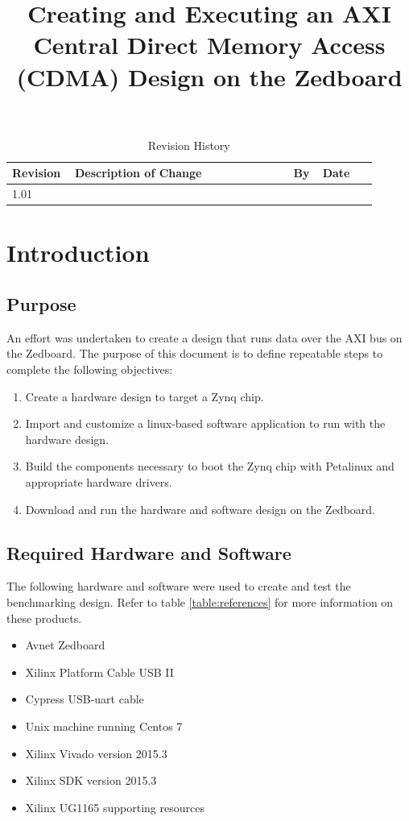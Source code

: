 \documentclass[12pt]{article}
\title{Creating and Executing an AXI Central Direct Memory Access (CDMA) Design on the Zedboard}
\begin{document}
\date{} %
\maketitle
\newpage
\begin{table}[h!]
  \caption{Revision History}
  \begin{tabular}{|p{0.12\linewidth}|p{0.57\linewidth}|p{0.07\linewidth}|p{0.14\linewidth}|}
    \hline
    \textbf{Revision} & \textbf{Description of Change} & \textbf{By} & \textbf{Date}\\ \hline
    1.01 &   &   &  \\ \hline
  \end{tabular}
\end{table}
\newpage
\tableofcontents
\newpage
{}

\section{Introduction}

\subsection{Purpose}
An effort was undertaken to create a design that runs data over the AXI bus on the Zedboard.  The purpose of this document is to define repeatable steps to complete the following objectives:

\begin{enumerate}

\item Create a hardware design to target a Zynq chip.
\item Import and customize a linux-based software application to run with the hardware design.
\item Build the components necessary to boot the Zynq chip with Petalinux and appropriate hardware drivers.
\item Download and run the hardware and software design on the Zedboard.
\end{enumerate}

\subsection{Required Hardware and Software}
The following hardware and software were used to create and test the benchmarking design.  Refer to table \ref{table:references} for more information on these products.
\begin{itemize}
\item Avnet Zedboard
\item Xilinx Platform Cable USB II
\item Cypress USB-uart cable
\item Unix machine running Centos 7
\item Xilinx Vivado version 2015.3
\item Xilinx SDK version 2015.3
\item Xilinx UG1165 supporting resources
\end{itemize}
\end{document}
